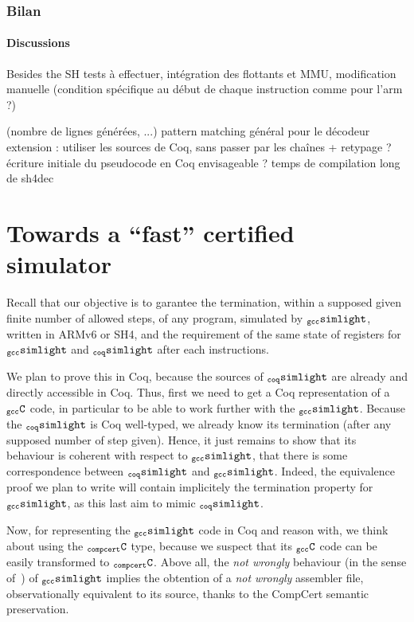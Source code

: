 \documentclass[a4paper, 11pt]{article}
\newcommand{\gccSL}{$_{\tt gcc}{\tt simlight}$\xspace}
\newcommand{\SL}{$_{\tt coq}{\tt simlight}$\xspace}
\newcommand{\C}{$_{\tt compcert}{\tt C}$\xspace}
\newcommand{\gccC}{$_{\tt gcc}{\tt C}$\xspace}
\begin{document}
    \subsubsection{Bilan}

    \paragraph{Discussions} 
Besides the SH
      tests à effectuer, intégration des flottants et MMU, modification manuelle (condition spécifique au début de chaque instruction comme pour l'arm ?)


      (nombre de lignes générées, ...)
pattern matching général pour le décodeur
    extension : utiliser les sources de Coq, sans passer par les chaînes + retypage ?
    écriture initiale du pseudocode en Coq envisageable ?
    temps de compilation long de sh4dec

\section{Towards a ``fast'' certified simulator}
\label{s:fast_certi}

Recall that our objective is to garantee the termination, within a supposed given finite number of allowed steps, of any program, simulated by \gccSL, written in ARMv6 or SH4, and the requirement of the same state of registers for \gccSL and \SL after each instructions. 

We plan to prove this in Coq, because the sources of \SL are already and directly accessible in Coq. Thus, first we need to get a Coq representation of a \gccC code, in particular to be able to work further with the \gccSL. 
Because the \SL is Coq well-typed, we already know its termination (after any supposed number of step given). Hence, it just remains to show that its behaviour is coherent with respect to \gccSL, that there is some correspondence between \SL and \gccSL. Indeed, the equivalence proof we plan to write will contain implicitely the termination property for \gccSL, as this last aim to mimic \SL. 

Now, for representing the \gccSL code in Coq and reason with, we think about using the \C type, because we suspect that its \gccC code can be easily transformed to \C. Above all, the \emph{not wrongly} behaviour (in the sense of~\cite{Leroy-Compcert-CACM}) of \gccSL implies the obtention of a \emph{not wrongly} assembler file, observationally equivalent to its source, thanks to the CompCert semantic preservation.
\end{document}
